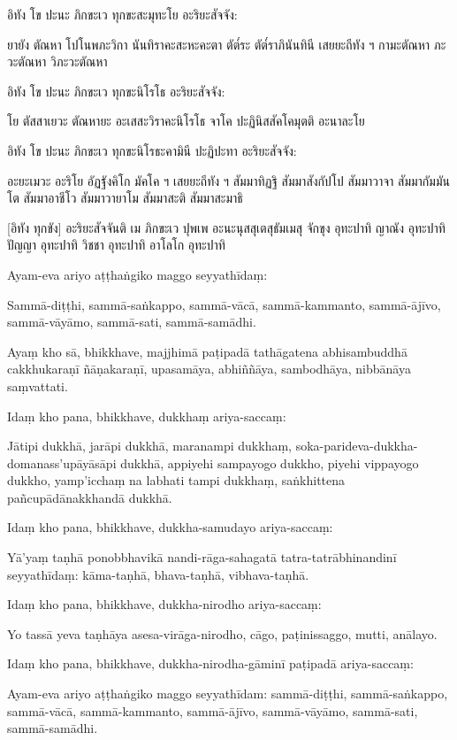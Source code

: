 \documentclass[
  babelLanguage=thai,
  final,
]{chantingbook}
\begin{document}
อิทัง โข ปะนะ ภิกขะเว ทุกขะสะมุทะโย อะริยะสัจจัง:

ยายัง ตัณหา โปโนพภะวิกา นันทิราคะสะหะคะตา ตัต๎ระ ตัต๎ราภินันทินี
เสยยะถีทัง ฯ กามะตัณหา ภะวะตัณหา วิภะวะตัณหา

อิทัง โข ปะนะ ภิกขะเว ทุกขะนิโรโธ อะริยะสัจจัง: 

โย ตัสสาเยวะ ตัณหายะ อะเสสะวิราคะนิโรโธ จาโค ปะฏินิสสัคโคมุตติ อะนาละโย

อิทัง โข ปะนะ ภิกขะเว ทุกขะนิโรธะคามินี ปะฏิปะทา อะริยะสัจจัง:

อะยะเมวะ อะริโย อัฏฐังคิโก มัคโค ฯ เสยยะถีทัง ฯ สัมมาทิฏฐิ สัมมาสังกัปโป
สัมมาวาจา สัมมากัมมันโต สัมมาอาชีโว สัมมาวายาโม สัมมาสะติ สัมมาสะมาธิ

[อิทัง ทุกขัง] อะริยะสัจจันติ เม ภิกขะเว ปุพเพ อะนะนุสสุเตสุธัมเมสุ จักขุง
อุทะปาทิ ญาณัง อุทะปาทิ ปัญญา อุทะปาทิ วิชชา อุทะปาทิ อาโลโก อุทะปาทิ

\clearpage

\paliText
\markboth{\paliTitle}{\rightmark}

Ayam-eva ariyo aṭṭhaṅgiko maggo seyyathīdaṃ:

Sammā-diṭṭhi, sammā-saṅkappo, sammā-vācā, sammā-kammanto, sammā-ājīvo,
sammā-vāyāmo, sammā-sati, sammā-samādhi.

Ayaṃ kho sā, bhikkhave, majjhimā paṭipadā tathāgatena abhisambuddhā
cakkhukaraṇī ñāṇakaraṇī, upasamāya, abhiññāya, sambodhāya, nibbānāya
saṃvattati.

Idaṃ kho pana, bhikkhave, dukkhaṃ ariya-saccaṃ:

Jātipi dukkhā, jarāpi dukkhā, maranampi dukkhaṃ,
soka-parideva-dukkha-domanass'upāyāsāpi dukkhā, appiyehi sampayogo
dukkho, piyehi vippayogo dukkho, yamp'icchaṃ na labhati tampi dukkhaṃ,
saṅkhittena pañcupādānakkhandā dukkhā.

Idaṃ kho pana, bhikkhave, dukkha-samudayo ariya-saccaṃ:

Yā'yaṃ taṇhā ponobbhavikā nandi-rāga-sahagatā tatra-tatrābhinandinī
seyyathīdaṃ: kāma-taṇhā, bhava-taṇhā, vibhava-taṇhā.

Idaṃ kho pana, bhikkhave, dukkha-nirodho ariya-saccaṃ:

Yo tassā yeva taṇhāya asesa-virāga-nirodho, cāgo, paṭinissaggo, mutti,
anālayo.

Idaṃ kho pana, bhikkhave, dukkha-nirodha-gāminī paṭipadā ariya-saccaṃ:

Ayam-eva ariyo aṭṭhaṅgiko maggo seyyathīdam: sammā-diṭṭhi,
sammā-saṅkappo, sammā-vācā, sammā-kammanto, sammā-ājīvo, sammā-vāyāmo,
sammā-sati, sammā-samādhi.
\end{document}

